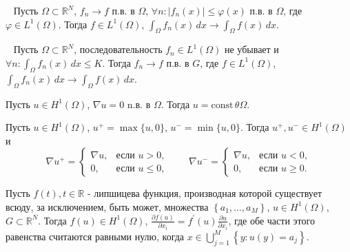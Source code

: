 \begin{theorem}[Лебег]
    \label{th:lebeg}~\cite[321]{Kolmogorov2004}
    Пусть $\Omega \subset \mathbb{R}^N$, $f_n \to f$ п.в. в $\Omega$,
    $\forall n : |f_n(x)| \leq \varphi(x)$ п.в. в $\Omega$,
    где $\varphi \in L^1(\Omega)$.
    Тогда $f \in L^1(\Omega)$, $\int_{\Omega} f_n(x) \, dx \to \int_{\Omega} f(x) \, dx$.
\end{theorem}

\begin{theorem}[Леви]
    \label{th:levi}~\cite[322]{Kolmogorov2004}
    Пусть $\Omega \subset \mathbb{R}^N$, последовательность $f_n \in L^1(\Omega)$
    не убывает и $\forall n : \int_{\Omega} f_n(x) \, dx \leq K$.
    Тогда $f_n \to f$ п.в. в $G$, где $f \in L^1(\Omega)$,
    $\int_{\Omega} f_n(x) \, dx \to \int_{\Omega} f(x) \, dx$.
\end{theorem}

\begin{lemma}
    \label{lm:1_7:15}\cite[47]{Ziemer1989}
    Пусть $u \in H^{1}(\Omega)$, $\nabla u = 0$ n.в. в $\Omega$.
    Тогда $u = \text{const}\, \theta \Omega$.
\end{lemma}

\begin{lemma}
    \label{lm:1_7:16}\cite[47]{Kinderlehrer1983}
    Пусть $u \in H^{1}(\Omega)$, $u^{+} = \max \{u, 0\}$,
    $u^{-} = \min \{u, 0\}$.
    Тогда $u^{+}, u^{-} \in H^{1}(\Omega)$ и
    \[
        \nabla u^{+} =
        \begin{cases}
            \nabla u, & \text{если } u > 0, \\
            0, & \text{если } u \leq 0,
        \end{cases}
        \qquad
        \nabla u^{-} =
        \begin{cases}
            \nabla u, & \text{если } u < 0, \\
            0, & \text{если } u \geq 0.
        \end{cases}
    \]
\end{lemma}

\begin{lemma}
    \label{lm:1_7:lipshitz}\cite[50]{Kinderlehrer1983}
    Пусть $f(t), t \in \mathbb{R}$ - липшицева функция,
    производная которой существует всюду, за исключением,
    быть может, множества $\left\{a_{1}, \ldots, a_{M}\right\}$,
    $u \in H^{1}(\Omega)$, $G \subset \mathbb{R}^{N}$.
    Тогда $f(u) \in H^{1}(\Omega)$,
    $\frac{\partial f(u)}{\partial x_{i}} = f^{\prime}(u)
    \frac{\partial u}{\partial x_{i}}$,
    где обе части этого равенства считаются равными нулю,
    когда $x \in \bigcup_{j=1}^{M}\left\{y: u(y)=a_{j}\right\}$.
\end{lemma}

